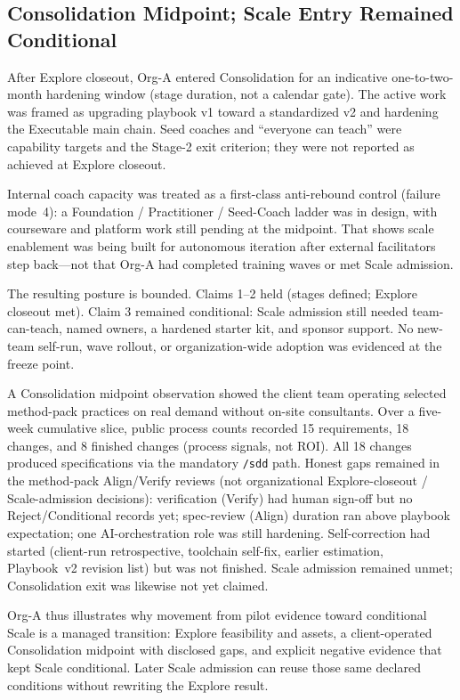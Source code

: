 \documentclass[10pt,conference]{IEEEtran}
\begin{document}
\subsection{Consolidation Midpoint; Scale Entry Remained Conditional}

After Explore closeout, Org-A entered Consolidation for an indicative
one-to-two-month hardening window (stage duration, not a calendar gate).
The active work was framed as upgrading playbook v1 toward a standardized
v2 and hardening the Executable main chain.  Seed coaches and ``everyone can teach''
were capability targets and the Stage-2 exit criterion; they were not
reported as achieved at Explore closeout.

Internal coach capacity was treated as a first-class anti-rebound control
(failure mode~4): a Foundation / Practitioner / Seed-Coach ladder was in
design, with courseware and platform work still pending at the midpoint.
That shows scale enablement was being built for autonomous iteration after
external facilitators step back---not that Org-A had completed training waves
or met Scale admission.

The resulting posture is bounded.  Claims 1--2 held (stages defined; Explore
closeout met).  Claim 3 remained conditional: Scale admission still needed
team-can-teach, named owners, a hardened starter kit, and sponsor support.
No new-team self-run, wave rollout, or organization-wide adoption was
evidenced at the freeze point.

A Consolidation midpoint observation showed the client team operating selected
method-pack practices on real demand without on-site consultants.
Over a five-week cumulative slice, public process counts recorded 15
requirements, 18 changes, and 8 finished changes (process signals, not ROI).
All 18 changes produced specifications via the mandatory \texttt{/sdd} path.
Honest gaps remained in the method-pack Align/Verify reviews (not
organizational Explore-closeout / Scale-admission decisions): verification
(Verify) had human sign-off but no Reject/Conditional records yet;
spec-review (Align) duration ran above playbook expectation; one
AI-orchestration role was still hardening.
Self-correction had started (client-run retrospective, toolchain self-fix,
earlier estimation, Playbook~v2 revision list) but was not finished.
Scale admission remained unmet; Consolidation exit was likewise not yet claimed.

Org-A thus illustrates why movement from pilot evidence toward conditional
Scale is a managed transition: Explore feasibility and assets, a
client-operated Consolidation midpoint with disclosed gaps, and explicit
negative evidence that kept Scale conditional.  Later Scale admission can
reuse those same declared conditions without rewriting the Explore result.
\end{document}
